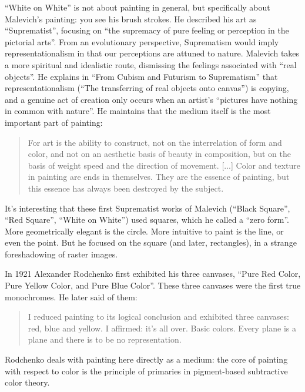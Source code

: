 \documentclass{thesis}
\begin{document}
	``White on White'' is not about painting in general, but specifically about Malevich's painting: you see his brush strokes. He described his art as ``Suprematist'', focusing on ``the supremacy of pure feeling or perception in the pictorial arts''. From an evolutionary perspective, Suprematism would imply representationalism in that our perceptions are attuned to nature. Malevich takes a more spiritual and idealistic route, dismissing the feelings associated with ``real objects''. He explains in ``From Cubism and Futurism to Suprematism'' that representationalism (``The transferring of real objects onto canvas'') is copying, and a genuine act of creation only occurs when an artist's ``pictures have nothing in common with nature''. He maintains that the medium itself is the most important part of painting:
	
	\begin{quote}
	For art is the ability to construct, not on the interrelation of form and color, and not on an aesthetic basis of beauty in composition, but on the basis of weight speed and the direction of movement. [...] Color and texture in painting are ends in themselves. They are the essence of painting, but this essence has always been destroyed by the subject.
	\end{quote}
	
	It's interesting that these first Suprematist works of Malevich (``Black Square'', ``Red Square'', ``White on White'') used squares, which he called a ``zero form''. More geometrically elegant is the circle. More intuitive to paint is the line, or even the point. But he focused on the square (and later, rectangles), in a strange foreshadowing of raster images.
	
	\cite{moma_rodchenko_1998}
	In 1921 Alexander Rodchenko first exhibited his three canvases, ``Pure Red Color, Pure Yellow Color, and Pure Blue Color''. These three canvases were the first true monochromes. He later said of them:
	
	\begin{quote}
	I reduced painting to its logical conclusion and exhibited three canvases: red, blue and yellow. I affirmed: it's all over. Basic colors. Every plane is a plane and there is to be no representation.
	\end{quote}
	
	Rodchenko deals with painting here directly as a medium: the core of painting with respect to color is the principle of primaries in pigment-based subtractive color theory.
	
\end{document}
